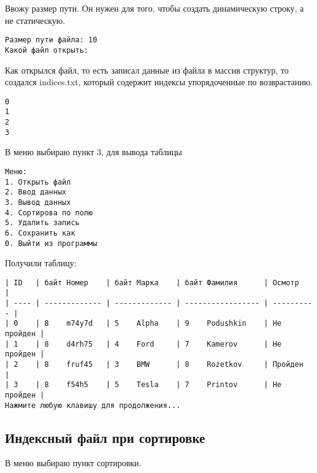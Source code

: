 Ввожу размер пути. Он нужен для того, чтобы создать динамическую строку, а не статическую.

\begin{tcolorbox}
\begin{verbatim}
Размер пути файла: 10 
Какой файл открыть: 
\end{verbatim}
\end{tcolorbox}

Как открылся файл, то есть записал данные из файла в массив структур, то создался indices.txt, который содержит индексы упорядоченные по возврастанию.

\begin{tcolorbox}
\begin{verbatim}
0
1
2
3
\end{verbatim}
\end{tcolorbox}

В меню выбираю пункт 3, для вывода таблицы

\begin{tcolorbox}
\begin{verbatim}
Меню:
1. Открыть файл
2. Ввод данных       
3. Вывод данных      
4. Сортирова по полю 
5. Удалить запись    
6. Сохранить как     
0. Выйти из программы
\end{verbatim}
\end{tcolorbox}

Получили таблицу:

\begin{tcolorbox}
\begin{verbatim}
| ID   | байт Номер    | байт Марка    | байт Фамилия      | Осмотр     | 
| ---- | ------------- | ------------- | ----------------- | ---------- | 
| 0    | 8    m74y7d   | 5    Alpha    | 9    Podushkin    | Не пройден | 
| 1    | 8    d4rh75   | 4    Ford     | 7    Kamerov      | Не пройден | 
| 2    | 8    fruf45   | 3    BMW      | 8    Rozetkov     | Пройден    | 
| 3    | 8    f54h5    | 5    Tesla    | 7    Printov      | Не пройден | 
Нажмите любую клавишу для продолжения...
\end{verbatim}
\end{tcolorbox}

\newpage

\subsection{Индексный файл при сортировке}

В меню выбираю пункт сортировки.

